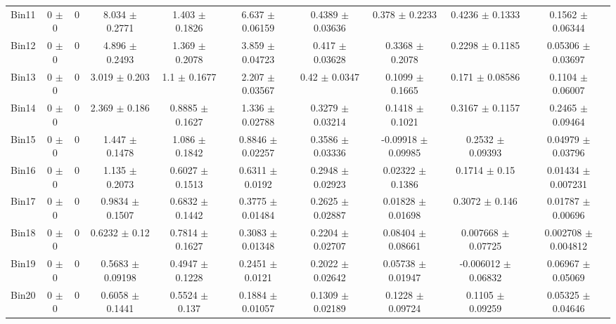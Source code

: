 \begin{tabular}{@{\extracolsep{4pt}}lccccccccc@{}}
     Bin11 & 0 $\pm$ 0 & 0 & 8.034 $\pm$ 0.2771 & 1.403 $\pm$ 0.1826 & 6.637 $\pm$ 0.06159 & 0.4389 $\pm$ 0.03636 & 0.378 $\pm$ 0.2233 & 0.4236 $\pm$ 0.1333 & 0.1562 $\pm$ 0.06344 \\ 
     Bin12 & 0 $\pm$ 0 & 0 & 4.896 $\pm$ 0.2493 & 1.369 $\pm$ 0.2078 & 3.859 $\pm$ 0.04723 & 0.417 $\pm$ 0.03628 & 0.3368 $\pm$ 0.2078 & 0.2298 $\pm$ 0.1185 & 0.05306 $\pm$ 0.03697 \\ 
     Bin13 & 0 $\pm$ 0 & 0 & 3.019 $\pm$ 0.203 & 1.1 $\pm$ 0.1677 & 2.207 $\pm$ 0.03567 & 0.42 $\pm$ 0.0347 & 0.1099 $\pm$ 0.1665 & 0.171 $\pm$ 0.08586 & 0.1104 $\pm$ 0.06007 \\ 
     Bin14 & 0 $\pm$ 0 & 0 & 2.369 $\pm$ 0.186 & 0.8885 $\pm$ 0.1627 & 1.336 $\pm$ 0.02788 & 0.3279 $\pm$ 0.03214 & 0.1418 $\pm$ 0.1021 & 0.3167 $\pm$ 0.1157 & 0.2465 $\pm$ 0.09464 \\ 
     Bin15 & 0 $\pm$ 0 & 0 & 1.447 $\pm$ 0.1478 & 1.086 $\pm$ 0.1842 & 0.8846 $\pm$ 0.02257 & 0.3586 $\pm$ 0.03336 & -0.09918 $\pm$ 0.09985 & 0.2532 $\pm$ 0.09393 & 0.04979 $\pm$ 0.03796 \\ 
     Bin16 & 0 $\pm$ 0 & 0 & 1.135 $\pm$ 0.2073 & 0.6027 $\pm$ 0.1513 & 0.6311 $\pm$ 0.0192 & 0.2948 $\pm$ 0.02923 & 0.02322 $\pm$ 0.1386 & 0.1714 $\pm$ 0.15 & 0.01434 $\pm$ 0.007231 \\ 
     Bin17 & 0 $\pm$ 0 & 0 & 0.9834 $\pm$ 0.1507 & 0.6832 $\pm$ 0.1442 & 0.3775 $\pm$ 0.01484 & 0.2625 $\pm$ 0.02887 & 0.01828 $\pm$ 0.01698 & 0.3072 $\pm$ 0.146 & 0.01787 $\pm$ 0.00696 \\ 
     Bin18 & 0 $\pm$ 0 & 0 & 0.6232 $\pm$ 0.12 & 0.7814 $\pm$ 0.1627 & 0.3083 $\pm$ 0.01348 & 0.2204 $\pm$ 0.02707 & 0.08404 $\pm$ 0.08661 & 0.007668 $\pm$ 0.07725 & 0.002708 $\pm$ 0.004812 \\ 
     Bin19 & 0 $\pm$ 0 & 0 & 0.5683 $\pm$ 0.09198 & 0.4947 $\pm$ 0.1228 & 0.2451 $\pm$ 0.0121 & 0.2022 $\pm$ 0.02642 & 0.05738 $\pm$ 0.01947 & -0.006012 $\pm$ 0.06832 & 0.06967 $\pm$ 0.05069 \\ 
     Bin20 & 0 $\pm$ 0 & 0 & 0.6058 $\pm$ 0.1441 & 0.5524 $\pm$ 0.137 & 0.1884 $\pm$ 0.01057 & 0.1309 $\pm$ 0.02189 & 0.1228 $\pm$ 0.09724 & 0.1105 $\pm$ 0.09259 & 0.05325 $\pm$ 0.04646 \\ 
\hline\hline
  \end{tabular}
